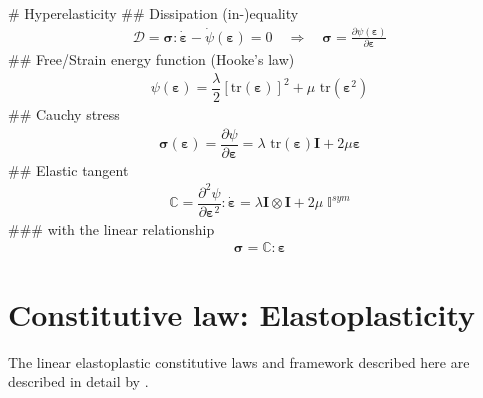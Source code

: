 \documentclass[]{scrartcl}
\begin{document}
\begin{easylist}[itemize]
# Hyperelasticity
## Dissipation (in-)equality
\begin{gather}
\mathcal{D} 
  = \boldsymbol{\sigma} : \dot{\boldsymbol{\varepsilon}} - \dot\psi \left( \boldsymbol{\varepsilon} \right) 
  = 0
\quad \Rightarrow \quad
\boldsymbol{\sigma} 
  = \frac{\partial \psi \left( \boldsymbol{\varepsilon} \right)}{\partial \boldsymbol{\varepsilon}}
\end{gather}
## Free/Strain energy function (Hooke's law)
\begin{gather}
\psi(\boldsymbol{\varepsilon})
  = \dfrac{\lambda}{2} \left[\textrm{tr}(\boldsymbol{\varepsilon})\right]^2 
  + \mu \textrm{ tr}(\boldsymbol{\varepsilon}^2)
\end{gather}
## Cauchy stress
\begin{gather}
\boldsymbol{\sigma}(\boldsymbol{\varepsilon}) =  \dfrac{\partial \psi}{\partial \boldsymbol{\varepsilon}} = \lambda \textrm{ tr}(\boldsymbol{\varepsilon}) \mathbf{I} + 2\mu\boldsymbol{\varepsilon}
\end{gather}
## Elastic tangent
\begin{gather}
\mathbb{C} = \dfrac{{\partial}^2 \psi}{\partial \boldsymbol{\varepsilon}^2}: \dot{\boldsymbol{\varepsilon}} = \lambda \mathbf{I} \otimes \mathbf{I} + 2\mu\;\mathbb{I}^{sym}
\end{gather}
### with the linear relationship
\begin{gather}
\boldsymbol{\sigma}
  = \boldsymbol{\mathbb{C}} : \boldsymbol{\varepsilon}
\end{gather}
\end{easylist}

\clearpage
\section{Constitutive law: Elastoplasticity}

The linear elastoplastic constitutive laws and framework described here are described in detail by \citep{Simo2006a,Mergheim2018a}.
\end{document}
